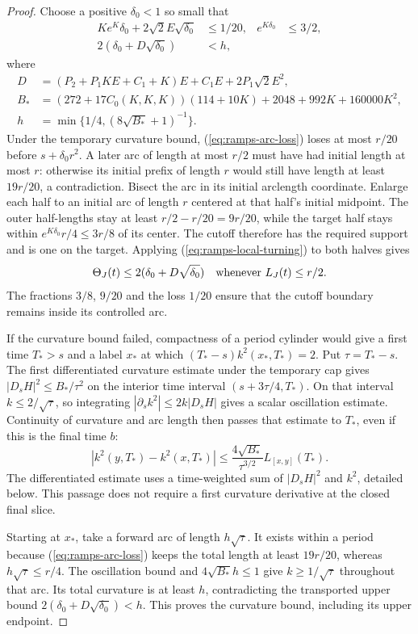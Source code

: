 \begin{proof}
Choose a positive $\delta_0<1$ so small that
\begin{align*}
 Ke^K\delta_0+2\sqrt2E\sqrt{\delta_0}&\leq1/20,&
 e^{K\delta_0}&\leq3/2,\\
 2(\delta_0+D\sqrt{\delta_0})&<h,
\end{align*}
where
\begin{align*}
 D&=(P_2+P_1KE+C_1+K)E+C_1E+2P_1\sqrt2E^2,\\
 B_*&=(272+17C_0(K,K,K))(114+10K)
                       +2048+992K+160000K^2,\\
 h&=\min\{1/4,(8\sqrt{B_*}+1)^{-1}\}.
\end{align*}
Under the temporary curvature bound, (\ref{eq:ramps-arc-loss}) loses at
most $r/20$ before $s+\delta_0r^2$.  A later arc of length at most $r/2$
must have had initial length at most $r$: otherwise its initial prefix of
length $r$ would still have length at least $19r/20$, a contradiction.
Bisect the arc in its initial arclength coordinate.  Enlarge each half
to an initial arc of length $r$ centered at that half's initial midpoint.
The outer half-lengths stay at least $r/2-r/20=9r/20$, while the target
half stays within $e^{K\delta_0}r/4\leq3r/8$ of its center.
The cutoff therefore has the required support and is one on the target.
Applying (\ref{eq:ramps-local-turning}) to both halves gives
\[
 \Theta_J(t)\leq2(\delta_0+D\sqrt{\delta_0})
 \quad\hbox{whenever } L_J(t)\leq r/2.
\]
The fractions $3/8$, $9/20$ and the loss $1/20$ ensure that the cutoff
boundary remains inside its controlled arc.

If the curvature bound failed, compactness of a period cylinder would
give a first time $T_*>s$ and a label $x_*$ at which
$(T_*-s)k^2(x_*,T_*)=2$.  Put $\tau=T_*-s$.
The first differentiated curvature estimate under the temporary cap gives
$|D_sH|^2\leq B_*/\tau^2$ on the interior time interval
$(s+3\tau/4,T_*)$.  On that interval $k\leq2/\sqrt\tau$, so integrating
$|\partial_sk^2|\leq2k|D_sH|$ gives a scalar oscillation estimate.
Continuity of curvature and arc length then passes that estimate to
$T_*$, even if this is the final time $b$:
\[
 |k^2(y,T_*)-k^2(x,T_*)|
 \leq\frac{4\sqrt{B_*}}{\tau^{3/2}}L_{[x,y]}(T_*).
\]
The differentiated estimate uses a time-weighted sum of $|D_sH|^2$ and
$k^2$, detailed below.  This passage does not require a first curvature
derivative at the closed final slice.

Starting at $x_*$, take a forward arc of length $h\sqrt\tau$.
It exists within a period because (\ref{eq:ramps-arc-loss}) keeps the
total length at least $19r/20$, whereas $h\sqrt\tau\leq r/4$.
The oscillation bound and $4\sqrt{B_*}h\leq1$ give
$k\geq1/\sqrt\tau$ throughout that arc.  Its total curvature is at least
$h$, contradicting the transported upper bound
$2(\delta_0+D\sqrt{\delta_0})<h$.  This proves the curvature bound,
including its upper endpoint.


\end{proof}
